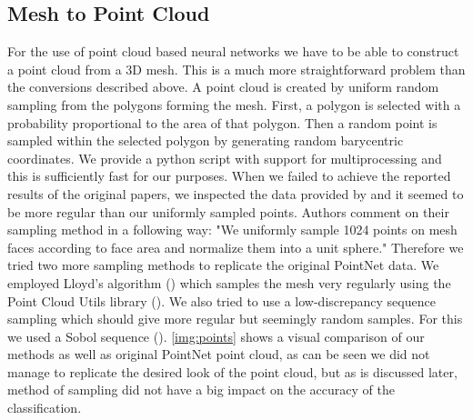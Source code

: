 \subsection{Mesh to Point Cloud}
\label{subsec:pointcloud}
For the use of point cloud based neural networks we have to be able to construct a point cloud from a 3D mesh. This is a much more straightforward problem than the conversions described above. A point cloud is created by uniform random sampling from the polygons forming the mesh. First, a polygon is selected with a probability proportional to the area of that polygon. Then a random point is sampled within the selected polygon by generating random barycentric coordinates. We provide a python script with support for multiprocessing and this is sufficiently fast for our purposes. When we failed to achieve the reported results of the original papers, we inspected the data provided by \cite{qi_pointnet_2016} and it seemed to be more regular than our uniformly sampled points. Authors comment on their sampling method in a following way: "We uniformly sample 1024 points on mesh faces according
to face area and normalize them into a unit sphere." Therefore we tried two more sampling methods to replicate the original PointNet data. We employed Lloyd's algorithm (\cite{lloyd_least_1982}) which samples the mesh very regularly using the Point Cloud Utils library (\cite{williams_point_2019}). We also tried to use a low-discrepancy sequence sampling which should give more regular but seemingly random samples. For this we used a Sobol sequence (\cite{sobol_distribution_1967}). \autoref{img:points} shows a visual comparison of our methods as well as original PointNet point cloud, as can be seen we did not manage to replicate the desired look of the point cloud, but as is discussed later, method of sampling did not have a big impact on the accuracy of the classification.

